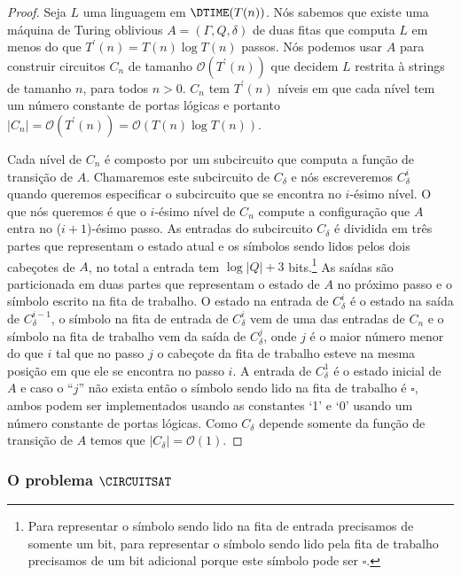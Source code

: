 \begin{proof}

Seja $L$ uma linguagem em $\DTIME(T(n))$. Nós sabemos que existe uma máquina de Turing oblivious $A = (\Gamma, Q, \delta)$ de duas fitas que computa $L$ em menos do que $T^{\prime}(n) = T(n)\log T(n)$ passos. Nós podemos usar $A$ para construir circuitos $C_{n}$ de tamanho $\mathcal{O}(T^{\prime}(n))$ que decidem $L$ restrita à strings de tamanho $n$, para todos $n > 0$. $C_{n}$ tem $T^{\prime}(n)$ níveis em que cada nível tem um número constante de portas lógicas e portanto $\lvert C_{n} \rvert = \mathcal{O}(T^{\prime}(n)) = \mathcal{O}(T(n) \log T(n))$.

Cada nível de $C_{n}$ é composto por um subcircuito que computa a função de transição de $A$. Chamaremos este subcircuito de $C_{\delta}$ e nós escreveremos $C_{\delta}^{i}$ quando queremos especificar o subcircuito que se encontra no $i$-ésimo nível. O que nós queremos é que o $i$-ésimo nível de $C_{n}$ compute a configuração que $A$ entra no ($i + 1$)-ésimo passo. As entradas do subcircuito $C_{\delta}$ é dividida em três partes que representam o estado atual e os símbolos sendo lidos pelos dois cabeçotes de $A$, no total a entrada tem $\log\lvert Q\rvert + 3$ bits.\footnote{Para representar o símbolo sendo lido na fita de entrada precisamos de somente um bit, para representar o símbolo sendo lido pela fita de trabalho precisamos de um bit adicional porque este símbolo pode ser $\square$.} As saídas são particionada em duas partes que representam o estado de $A$ no próximo passo e o símbolo escrito na fita de trabalho. O estado na entrada de $C_{\delta}^{i}$ é o estado na saída de $C_{\delta}^{i - 1}$, o símbolo na fita de entrada de $C_{\delta}^{i}$ vem de uma das entradas de $C_{n}$ e o símbolo na fita de trabalho vem da saída de $C_{\delta}^{j}$, onde $j$ é o maior número menor do que $i$ tal que no passo $j$ o cabeçote da fita de trabalho esteve na mesma posição em que ele se encontra no passo $i$. A entrada de $C_{\delta}^{1}$ é o estado inicial de $A$ e caso o ``$j$'' não exista então o símbolo sendo lido na fita de trabalho é $\square$, ambos podem ser implementados usando as constantes `1' e `0' usando um número constante de portas lógicas. Como $C_{\delta}$ depende somente da função de transição de $A$ temos que $\lvert C_{\delta} \vert = \mathcal{O}(1)$.

\end{proof}

\subsubsection{O problema $\CIRCUITSAT$}

